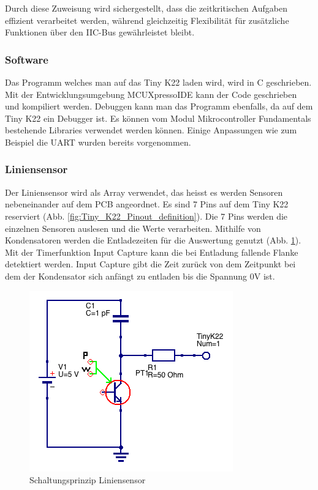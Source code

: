 Durch diese Zuweisung wird sichergestellt, dass die zeitkritischen Aufgaben effizient verarbeitet werden, während gleichzeitig Flexibilität für zusätzliche Funktionen über den IIC-Bus gewährleistet bleibt.




\subsubsection{Software}

Das Programm welches man auf das Tiny K22 laden wird, wird in C geschrieben. Mit der Entwicklungsumgebung MCUXpressoIDE kann der Code geschrieben und kompiliert werden. Debuggen kann man das Programm ebenfalls, da auf dem Tiny K22 ein Debugger ist. Es können vom Modul Mikrocontroller Fundamentals bestehende Libraries verwendet werden können. Einige Anpassungen wie zum Beispiel die UART wurden bereits vorgenommen.


\subsubsection{Liniensensor}

Der Liniensensor wird als Array verwendet, das heisst es werden Sensoren nebeneinander auf dem PCB angeordnet. Es sind 7 Pins auf dem Tiny K22 reserviert (Abb. \ref{fig:Tiny_K22_Pinout_definition}). Die 7 Pins werden die einzelnen Sensoren auslesen und die Werte verarbeiten. Mithilfe von Kondensatoren werden die Entladezeiten für die Auswertung genutzt (Abb. \ref{fig:Liniensensor_Schaltung}). Mit der Timerfunktion Input Capture kann die bei Entladung fallende Flanke detektiert werden. Input Capture gibt die Zeit zurück von dem Zeitpunkt bei dem der Kondensator sich anfängt zu entladen bis die Spannung 0V ist.


\begin{figure}[H]
    \centering
    \includegraphics[width=0.8\linewidth]{img/Liniensensor_Schaltung.png}
    \caption{Schaltungsprinzip Liniensensor}
    \label{fig:Liniensensor_Schaltung}
\end{figure}


